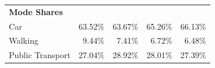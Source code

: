 \begin{table}[]
\begin{tabular}{@{}lrrrr@{}}
\textbf{Mode Shares}               & \multicolumn{1}{l}{}         & \multicolumn{1}{l}{}         & \multicolumn{1}{l}{}         & \multicolumn{1}{l}{}         \\
Car                                & 63.52\%                      & 63.67\%                      & 65.26\%                      & 66.13\%                      \\
Walking                            & 9.44\%                       & 7.41\%                       & 6.72\%                       & 6.48\%                       \\
Public Transport                   & 27.04\%                      & 28.92\%                      & 28.01\%                      & 27.39\%                      \\ \bottomrule
\end{tabular}
\end{table}
